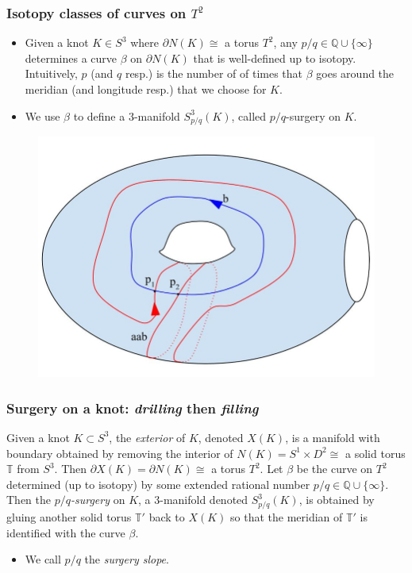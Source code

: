 \documentclass{beamer}
\theoremstyle{ex}
\theoremstyle{rem}
\begin{document}
	\begin{frame}
		\frametitle{Isotopy classes of curves on $T^2$}
		
			
		\begin{itemize}
		\item Given a knot $K \in S^3$ where $\partial N(K) \cong$ a torus $T^2$, any $p/q \in \mathbb{Q}\cup\{\infty\}$ determines a curve $\beta$ on $\partial N(K)$ that is well-defined up to isotopy. Intuitively, $p$ (and $q$ resp.) is the number of of times that $\beta$ goes around the meridian (and longitude resp.) that we choose for $K$. 
		\item We use $\beta$ to define a $3$-manifold $S^3_{p/q}(K)$, called $p/q$-surgery on $K$.
		\end{itemize}
		\begin{figure}
			\includegraphics[scale=0.2]{torusknot}
		\end{figure}
	\end{frame}

	\begin{frame}
		\frametitle{Surgery on a knot: \textit{drilling} then \textit{filling}}
		\begin{definition}
		Given a knot $K \subset S^3$, the \textit{exterior} of $K$, denoted $X(K)$, is a manifold with boundary obtained by removing the interior of $N(K) = S^1 \times D^2 \cong$ a solid torus $\mathbb{T}$ from $S^3$. Then $\partial X(K) = \partial N(K) \cong$ a torus $T^2$. Let $\beta$ be the curve on $T^2$ determined (up to isotopy) by some extended rational number $p/q \in \mathbb{Q}\cup\{\infty\}$. Then the \textit{$p/q$-surgery} on $K$, a $3$-manifold denoted $S^3_{p/q}(K)$, is obtained by gluing another solid torus $\mathbb{T'}$ back to $X(K)$ so that the meridian of $\mathbb{T'}$ is identified with the curve $\beta$. 
		\end{definition}
	\begin{itemize}
		\item We call $p/q$ the \textit{surgery slope}.
	\end{itemize}
	\end{frame}
\end{document}
